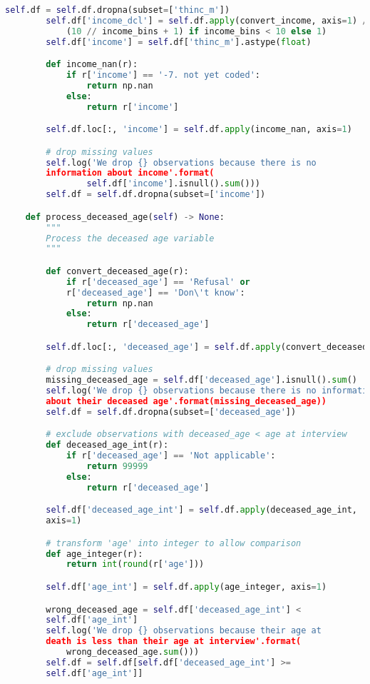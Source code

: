 \begin{lstlisting}[language=Python]
        self.df = self.df.dropna(subset=['thinc_m'])
        self.df['income_dcl'] = self.df.apply(convert_income, axis=1) // (
            (10 // income_bins + 1) if income_bins < 10 else 1)
        self.df['income'] = self.df['thinc_m'].astype(float)

        def income_nan(r):
            if r['income'] == '-7. not yet coded':
                return np.nan
            else:
                return r['income']

        self.df.loc[:, 'income'] = self.df.apply(income_nan, axis=1)

        # drop missing values
        self.log('We drop {} observations because there is no
        information about income'.format(
                self.df['income'].isnull().sum()))
        self.df = self.df.dropna(subset=['income'])

    def process_deceased_age(self) -> None:
        """
        Process the deceased age variable
        """

        def convert_deceased_age(r):
            if r['deceased_age'] == 'Refusal' or
            r['deceased_age'] == 'Don\'t know':
                return np.nan
            else:
                return r['deceased_age']

        self.df.loc[:, 'deceased_age'] = self.df.apply(convert_deceased_age, axis=1)

        # drop missing values
        missing_deceased_age = self.df['deceased_age'].isnull().sum()
        self.log('We drop {} observations because there is no information
        about their deceased age'.format(missing_deceased_age))
        self.df = self.df.dropna(subset=['deceased_age'])

        # exclude observations with deceased_age < age at interview
        def deceased_age_int(r):
            if r['deceased_age'] == 'Not applicable':
                return 99999
            else:
                return r['deceased_age']

        self.df['deceased_age_int'] = self.df.apply(deceased_age_int,
        axis=1)

        # transform 'age' into integer to allow comparison
        def age_integer(r):
            return int(round(r['age']))

        self.df['age_int'] = self.df.apply(age_integer, axis=1)

        wrong_deceased_age = self.df['deceased_age_int'] < 
        self.df['age_int']
        self.log('We drop {} observations because their age at
        death is less than their age at interview'.format(
            wrong_deceased_age.sum()))
        self.df = self.df[self.df['deceased_age_int'] >= 
        self.df['age_int']]


\end{lstlisting}
